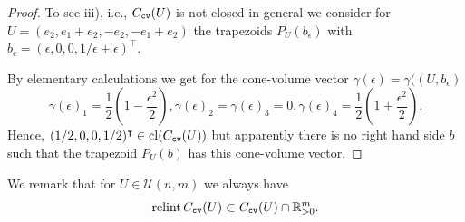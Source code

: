 \documentclass[11pt, a4paper, twoside, reqno]{amsart}
\DeclareMathOperator*{\cl}{cl}
\newcommand{\R}{\mathbb{R}}
\theoremstyle{definition}
\theoremstyle{remark}
\newcommand{\cv}{{\tt cv}}
\DeclareMathOperator{\relint}{relint}
\numberwithin{equation}{section}
\begin{document}
\begin{proof}
To see iii), i.e., $C_\cv(U)$ is not closed in general we consider for
$U=(e_2,e_1+e_2,-e_2,-e_1+e_2)$ the trapezoids $P_U(b_\epsilon)$ with $b_\epsilon=(\epsilon,0,0,1/\epsilon+\epsilon)^\intercal$.

By elementary calculations we get for the cone-volume vector
$\gamma(\epsilon)=\gamma((U,b_\epsilon)$
\begin{equation*}
         \gamma(\epsilon)_1=\frac{1}{2}\left(1-\frac{\epsilon^2}{2}\right),
         \gamma(\epsilon)_2=\gamma(\epsilon)_3=0, \gamma(\epsilon)_4=\frac{1}{2}\left(1+\frac{\epsilon^2}{2}\right).
\end{equation*}
Hence, $(1/2,0,0,1/2)^\intercal\in\cl(C_\cv(U))$ but apparently there
is no right hand side $b$ such that the trapezoid $P_U(b)$ has this cone-volume vector.
\end{proof}

We remark that for $U\in\mathcal{U}(n,m)$ we always have
\begin{equation*}
  \relint C_\cv(U) \subset C_\cv(U)\cap\R^m_{>0}.
\end{equation*}
\end{document}
